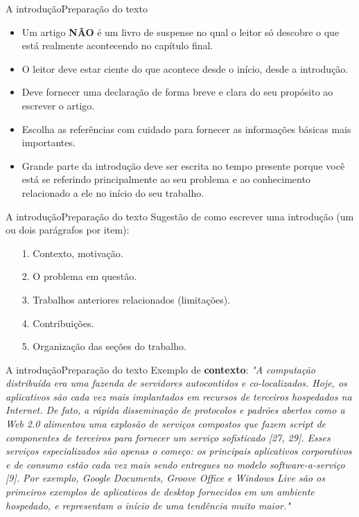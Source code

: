 \documentclass[t]{beamer}
\begin{document}

\begin{ftst}{A introdução}{Preparação do texto}
\justifying
\small
\begin{itemize}
    \item Um artigo \textbf{NÃO} é um livro de suspense no qual o leitor só descobre o que está realmente acontecendo no capítulo final. 
    \item O leitor deve estar ciente do que acontece desde o início, desde a introdução.
    \item Deve fornecer uma declaração de forma breve e clara do seu propósito ao escrever o artigo.
    \item Escolha as referências com cuidado para fornecer as informações básicas mais importantes.
    \item Grande parte da introdução deve ser escrita no tempo presente porque você está se referindo principalmente ao seu problema e ao conhecimento relacionado a ele no início do seu trabalho.
    
\end{itemize}
\end{ftst}


\begin{ftst}{A introdução}{Preparação do texto}
\justifying
Sugestão de como escrever uma introdução (um ou dois parágrafos por item):
\small
\vone
\begin{itemize}
    \item[1.] Contexto, motivação.
    \item[2.] O problema em questão.
    \item[3.] Trabalhos anteriores relacionados (limitações).
    \item[4.] Contribuições.
    \item[5.] Organização das seções do trabalho.
\end{itemize}
\end{ftst}


\begin{ftst}{A introdução}{Preparação do texto}
\justifying
Exemplo de \textbf{contexto}:
\small
\vone
\textit{"A computação distribuída era uma fazenda de servidores autocontidos e co-localizados. Hoje, os aplicativos são cada vez mais implantados em recursos de terceiros hospedados na Internet. De fato, a rápida disseminação de protocolos e padrões abertos como a Web 2.0 alimentou uma explosão de serviços compostos que fazem script de componentes de terceiros para fornecer um serviço sofisticado [27, 29]. Esses serviços especializados são apenas o começo: os principais aplicativos corporativos e de consumo estão cada vez mais sendo entregues no modelo software-a-serviço [9]. Por exemplo, Google Documents, Groove Office e Windows Live são os primeiros exemplos de aplicativos de desktop fornecidos em um ambiente hospedado, e representam o início de uma tendência muito maior."}
\end{ftst}
\end{document}

